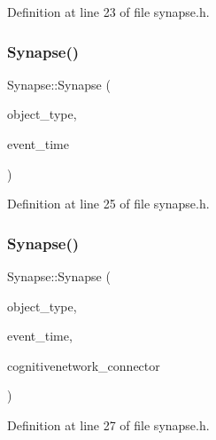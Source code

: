 Definition at line 23 of file synapse.\+h.

\mbox{\label{class_synapse_a339a3dff64e545fc7c013b251737257b}} 
\subsubsection{\texorpdfstring{Synapse()}{Synapse()}\hspace{0.1cm}{\footnotesize\ttfamily [3/4]}}
{\footnotesize\ttfamily Synapse\+::\+Synapse (\begin{DoxyParamCaption}\item[{unsigned int}]{object\+\_\+type,  }\item[{std\+::chrono\+::time\+\_\+point$<$ \mbox{\hyperlink{universe_8h_a0ef8d951d1ca5ab3cfaf7ab4c7a6fd80}{Clock}} $>$}]{event\+\_\+time }\end{DoxyParamCaption})\hspace{0.3cm}{\ttfamily [inline]}}



Definition at line 25 of file synapse.\+h.

\mbox{\label{class_synapse_ab651f847b74235df5121fe42faf3f253}} 
\subsubsection{\texorpdfstring{Synapse()}{Synapse()}\hspace{0.1cm}{\footnotesize\ttfamily [4/4]}}
{\footnotesize\ttfamily Synapse\+::\+Synapse (\begin{DoxyParamCaption}\item[{unsigned int}]{object\+\_\+type,  }\item[{std\+::chrono\+::time\+\_\+point$<$ \mbox{\hyperlink{universe_8h_a0ef8d951d1ca5ab3cfaf7ab4c7a6fd80}{Clock}} $>$}]{event\+\_\+time,  }\item[{\mbox{\hyperlink{class_cognitive_network}{Cognitive\+Network}} \&}]{cognitivenetwork\+\_\+connector }\end{DoxyParamCaption})\hspace{0.3cm}{\ttfamily [inline]}}



Definition at line 27 of file synapse.\+h.


